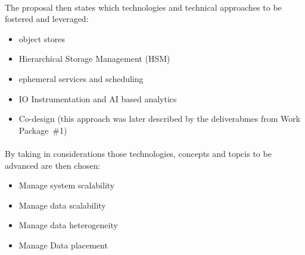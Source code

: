 \paragraph{}
The proposal then states which technologies and technical approaches to be fostered and leveraged:
\begin{itemize}
    \item object stores
    \item Hierarchical Storage Management (HSM)
    \item ephemeral services and scheduling
    \item IO Instrumentation and AI based analytics
    \item Co-design (this approach was later described by the deliverabmes from Work Package~\#1\cite{iosea-d1.1})
\end{itemize}

\paragraph{}
By taking in considerations those technologies, concepts and topcis to be advanced are then chosen:
\begin{itemize}
    \item Manage system scalability
    \item Manage data scalability
    \item Manage data heterogeneity
    \item Manage Data placement
\end{itemize}

